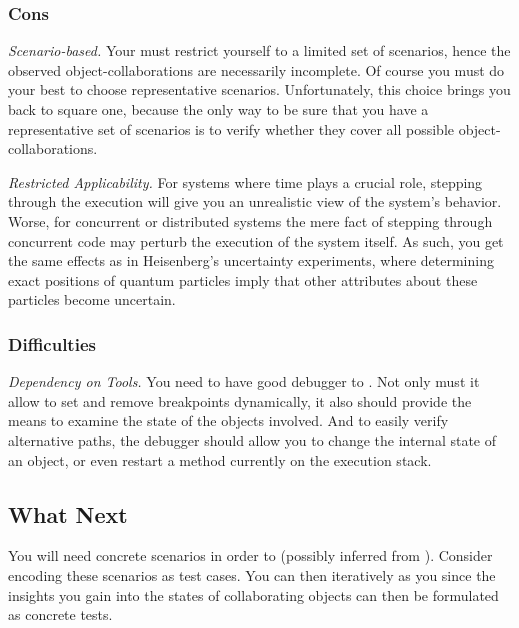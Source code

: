 \documentclass[a4paper,10pt,twoside]{book}
\begin{document}
\subsubsection*{Cons}

\begin{bulletlist}
\item \emph{Scenario-based.}
Your must restrict yourself to a limited set of scenarios, hence the observed object-collaborations are necessarily incomplete. Of course you must do your best to choose representative scenarios. Unfortunately, this choice brings you back to square one, because the only way to be sure that you have a representative set of scenarios is to verify whether they cover all possible object-collaborations.

\item \emph{Restricted Applicability.}
For systems where time plays a crucial role, stepping through the execution will give you an unrealistic view of the system's behavior. Worse, for concurrent or distributed systems the mere fact of stepping through concurrent code may perturb the execution of the system itself. As such, you get the same effects as in Heisenberg's uncertainty experiments, where determining exact positions of quantum particles imply that other attributes about these particles become uncertain.
\end{bulletlist}

\subsubsection*{Difficulties}

\begin{bulletlist}
\item \emph{Dependency on Tools.}
You need to have good debugger to . Not only must it allow to set and remove breakpoints dynamically, it also should provide the means to examine the state of the objects involved. And to easily verify alternative paths, the debugger should allow you to change the internal state of an object, or even restart a method currently on the execution stack.
\end{bulletlist}

\subsection*{What Next}

You will need concrete scenarios in order to  (possibly inferred from ). Consider encoding these scenarios as test cases. You can then iteratively  as you  since the insights you gain into the states of collaborating objects can then be formulated as concrete tests.
\end{document}
